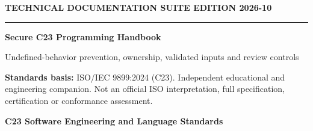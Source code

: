 \documentclass[10pt,letterpaper,oneside]{report}
\begin{document}
\hypersetup{pageanchor=false}%
\begin{titlepage}
\color{ink}\vspace*{1.2in}
{\sffamily\small\color{accent}\bfseries TECHNICAL DOCUMENTATION SUITE \hfill EDITION 2026-10}\par
\vspace{.3in}\rule{\linewidth}{1.5pt}\par\vspace{.22in}
{\Huge\bfseries Secure C23 Programming Handbook}\par\vspace{.22in}
{\Large\color{grayblue}Undefined-behavior prevention, ownership, validated inputs and review controls}\par\vspace{.4in}
\begin{keybox}\textbf{Standards basis:} ISO/IEC 9899:2024 (C23). Independent educational and engineering companion. Not an official ISO interpretation, full specification, certification or conformance assessment.\end{keybox}
\vfill{\large\bfseries C23 Software Engineering and Language Standards}\par{}\par
\end{titlepage}\hypersetup{pageanchor=true}
\tableofcontents\clearpage{}
\end{document}
